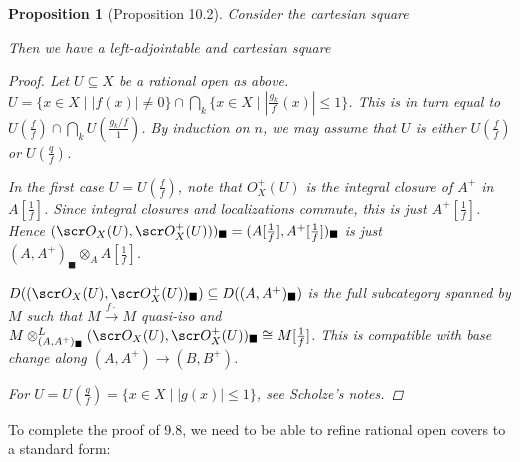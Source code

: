 \documentclass[A4paper, british, reqno]{amsart}
\theoremstyle{darkgreentheorem}
\newtheorem{prop}[thm]{Proposition}
\theoremstyle{darkbluedefinition}
\theoremstyle{darkredexample}
\theoremstyle{remark}
\DeclareMathOperator{\Spa}{Spa}
\newcommand{\1}{\mathbbm{1}}
\newcommand{\ot}{\otimes}
\newcommand{\sub}{\subseteq}
\newcommand{\usolid}{_{\blacksquare}}
\begin{document}
\begin{prop}[Proposition 10.2]
    Consider the cartesian square
    \begin{center}
    \end{center}
    Then we have a left-adjointable and cartesian square
    \begin{center}
    \end{center}
    \begin{proof}
	Let $U\sub X$ be a rational open as above.
	$U=\{x\in X\mid |f(x)|\neq 0\}\cap \bigcap_{k}\{x\in X\mid |\frac{g_{k}}{f}(x)|\leqslant 1\}$.
	This is in turn equal to $U(\frac{f}{f})\cap \bigcap_{k}U(\frac{g_{k}/f}{1})$.
	By induction on $n$, we may assume that $U$ is either $U(\frac{f}{f})$ or $U(\frac{q}{f})$.
	
	In the first case $U=U(\frac{f}{f})$, note that $O_{X}^{+}(U)$ is the integral closure of $A^{+}$ in $A[\frac{1}{f}]$.
	Since integral closures and localizations commute, this is just $A^{+}[\frac{1}{f}]$.
    Hence $(\O_{X}(U),\O_{X}^{+}(U)))\usolid=(A[\frac{1}{f}],A^{+}[\frac{1}{f}])\usolid$ is just $(A,A^{+})\usolid \ot_{A}A[\frac{1}{f}]$.

	$D((\O_{X}(U),\O_{X}^{+}(U))\usolid )\sub D((A,A^{+})\usolid)$ is the full subcategory spanned by $M$ such that $M\xrightarrow{f\cdot }M$ quasi-iso and $M\ot_{(A,A^{+})\usolid}^{L}(\O_{X}(U),\O_{X}^{+}(U))\usolid \cong M[\frac{1}{f}]$.
	This is compatible with base change along $(A,A^{+})\to (B,B^{+})$.

	For $U=U(\frac{g}{f})=\{x\in X\mid |g(x)|\leqslant 1\}$, see Scholze's notes.
    \end{proof}
\end{prop}

To complete the proof of 9.8, we need to be able to refine rational open covers to a standard form:
\end{document}
